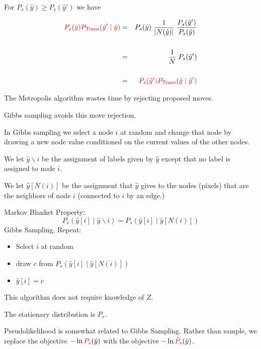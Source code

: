 {For $P_s(\hat{y}) \geq P_s(\hat{y}')$ we have

\begin{eqnarray*}
{\color{red} P_s(\hat{y})P_{\mathrm{Trans}}(\hat{y}'\;|\;\hat{y})} & = & P_s(\hat{y})\;\frac{1}{|N(\hat{y})|}\;\frac{P_s(\hat{y}')}{P_s(\hat{y})} \\
\\
& = & \frac{1}{N}\;P_s(\hat{y}') \\
\\
& = & {\color{red} P_s(\hat{y}')P_{\mathrm{Trans}}(\hat{y}\;|\;\hat{y}')}
\end{eqnarray*}


The Metropolis algorithm wastes time by rejecting proposed moves.

\vfill
Gibbs sampling avoids this move rejection.

\vfill
In Gibbs sampling we select a node $i$ at random and change that node by drawing a new node value conditioned on the current values of the other nodes.

\vfill
We let {\color{red} $\hat{y} \backslash i$} be the assignment of labels given by $\hat{y}$ except that no label is assigned to node $i$.

\vfill
We let {\color{red} $\hat{y}[N(i)]$} be the assignment that $\hat{y}$ gives to the nodes (pixels) that are the neighbors of node $i$ (connected to $i$ by an edge.)


Markov Blanket Property:
{\color{red} $$P_s(\hat{y}[i] \;|\;\hat{y} \backslash i) = P_s(\hat{y}[i] \;|\; \hat{y}[N(i)])$$}
\vfill
Gibbs Sampling, Repeat:

\begin{itemize}
\item   Select $i$ at random

\item draw $c$ from $P_s(\hat{y}[i] \;|\;\hat{y}[N(i)])$

\item $\hat{y}[i] = c$
\end{itemize}

\vfill
This algorithm does not require knowledge of $Z$.

\vfill
The stationary distribution is $P_s$.


Pseudolikelihood is somewhat related to Gibbs Sampling.  Rather than sample, we replace the objective
$- \ln {\color{red} P_s}(\hat{y})$ with the objective $- \ln {\color{red} \tilde{P}_s}(\hat{y})$.

}
